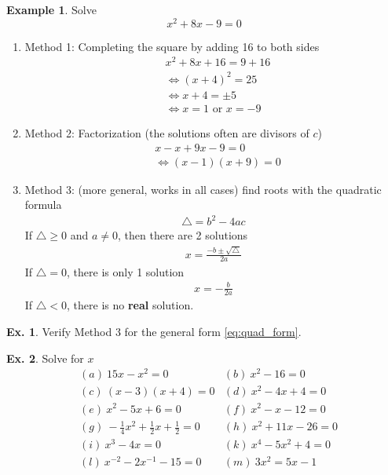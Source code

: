 \documentclass[10pt,a4paper]{book}
\theoremstyle{definition}\newtheorem{definition}{Definition}
\theoremstyle{definition}\newtheorem{fact}{Fact}
\theoremstyle{definition}\newtheorem{ex}{Ex.}
\theoremstyle{definition}\newtheorem{project}{Project}
\theoremstyle{definition}\newtheorem{problem}{Problem}
\theoremstyle{definition}\newtheorem{example}{Example}
\numberwithin{theorem}{chapter}
\numberwithin{corollary}{chapter}
\numberwithin{assumption}{chapter}
\numberwithin{definition}{chapter}
\numberwithin{prop}{chapter}
\numberwithin{notation}{chapter}
\numberwithin{problem}{chapter}
\numberwithin{example}{chapter}
\numberwithin{fact}{chapter}
\numberwithin{ex}{chapter}
\begin{document}
	\begin{example}
		Solve
		\begin{equation*}
			x^2 + 8x - 9 = 0
		\end{equation*}
		\begin{enumerate}
			\item Method 1: Completing the square by adding 16 to both sides
			\begin{align*}
				& x^2 + 8x + 16 = 9 + 16                   \\
				& \Leftrightarrow (x+4)^2 = 25             \\
				& \Leftrightarrow x+4 = \pm 5              \\
				& \Leftrightarrow x = 1 \text{ or } x = -9 
			\end{align*}
			\item Method 2: Factorization (the solutions often are divisors of $c$)
			\begin{align*}
				& x - x + 9x - 9 = 0             \\
				& \Leftrightarrow (x-1)(x+9) = 0 
			\end{align*}
			\item Method 3: (more general, works in all cases) find roots with the quadratic formula
			\begin{align*}
				\triangle = b^2 - 4ac 
			\end{align*}
			If $\triangle \geq 0$ and $a\neq 0$, then there are 2 solutions
			\begin{align*}
				x = \frac{-b \pm \sqrt{\triangle}}{2a} 
			\end{align*}
			If $\triangle = 0$,  there is only 1 solution
			\begin{align*}
				x = -\frac{b}{2a} 
			\end{align*}
			If $\triangle < 0$, there is no \textbf{real} solution.
		\end{enumerate}
	\end{example}
	
	\begin{ex}
		Verify Method 3 for the general form \eqref{eq:quad_form}.
	\end{ex}
	
	\begin{ex}
		Solve for $x$
		\begin{align*}
			& (a) \ 15x - x^2 = 0                                     & (b) \ x^2 - 16 = 0       \\
			& (c) \ (x-3)(x+4) = 0                                    & (d)\ x^2 - 4x + 4 = 0    \\
			& (e) \ x^2 - 5x + 6 = 0                                  & (f) \ x^2 - x - 12 = 0   \\
			& (g) \ -\frac{1}{4} x^2 + \frac{1}{2}x + \frac{1}{2} = 0 & (h) \ x^2 + 11x - 26 = 0 \\
			& (i) \ x^3 - 4x = 0                                      & (k) \ x^4 - 5x^2 + 4 = 0 \\
			& (l) \ x^{-2} - 2 x^{-1} - 15 = 0                        & (m) \ 3x^2 = 5x - 1      
		\end{align*}
	\end{ex}
	
\end{document}
